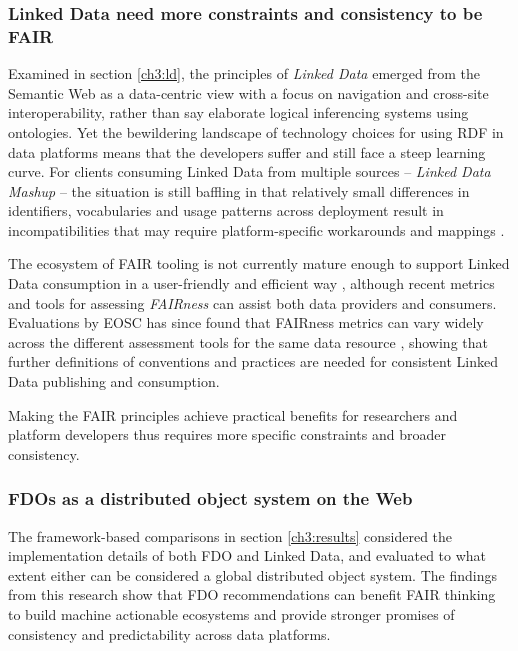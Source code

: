 \subsubsection{Linked Data need more constraints and consistency to be FAIR}

Examined in section \vref{ch3:ld}, the principles of \emph{Linked Data} emerged from the Semantic Web as a data-centric view with a focus on navigation and cross-site interoperability, rather than say elaborate logical inferencing systems using ontologies.  
Yet the bewildering landscape of technology choices for using RDF in data platforms means that the developers suffer and still face a steep learning curve. 
For clients consuming Linked Data from multiple sources -- \emph{Linked Data Mashup} \cite{Tran 2014} -- the situation is still baffling in that relatively small differences in identifiers, vocabularies and usage patterns across deployment result in incompatibilities that may require platform-specific workarounds and mappings \cite{Millard 2010}. 

The ecosystem of FAIR tooling is not currently mature enough to support Linked Data consumption in a user-friendly and efficient way \cite{Thompson 2020}, although recent metrics and tools for assessing \emph{FAIRness} \cite{Wilkinson 2018} can assist both data providers and consumers. 
Evaluations by EOSC has since found that FAIRness metrics can vary widely across the different assessment tools for the same data resource \cite{10.5281/zenodo.7463421}, showing that further definitions of conventions and practices are needed for consistent Linked Data publishing and consumption. 

Making the FAIR principles achieve practical benefits for researchers and platform developers thus requires more specific constraints and broader consistency.

\subsubsection{FDOs as a distributed object system on the Web}

The framework-based comparisons in section \vref{ch3:results} considered the implementation details of both FDO and Linked Data, and evaluated to what extent either can be considered a global distributed object system. 
The findings from this research show that FDO recommendations can benefit FAIR thinking to build machine actionable ecosystems and provide stronger promises of consistency and predictability across data platforms. 

